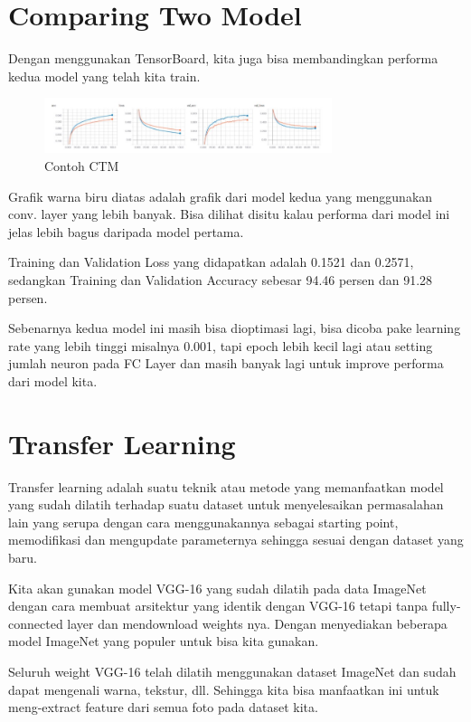 \section{Comparing Two Model}
Dengan menggunakan TensorBoard, kita juga bisa membandingkan performa kedua model yang telah kita train.
\begin{figure}[!htp]
	\includegraphics[width=0.75\textwidth]{figures/ComparingTwoModel.PNG}
	\caption{Contoh CTM}
	\label{labelgambar4}
\end{figure}

Grafik warna biru diatas adalah grafik dari model kedua yang menggunakan conv. layer yang lebih banyak. Bisa dilihat disitu kalau performa dari model ini jelas lebih bagus daripada model pertama.

Training dan Validation Loss yang didapatkan adalah 0.1521 dan 0.2571, sedangkan Training dan Validation Accuracy sebesar 94.46 persen dan 91.28 persen.

Sebenarnya kedua model ini masih bisa dioptimasi lagi, bisa dicoba pake learning rate yang lebih tinggi misalnya 0.001, tapi epoch lebih kecil lagi atau setting jumlah neuron pada FC Layer dan masih banyak lagi untuk improve performa dari model kita.




\section{Transfer Learning}
Transfer learning adalah suatu teknik atau metode yang memanfaatkan model yang sudah dilatih terhadap suatu dataset untuk menyelesaikan permasalahan lain yang serupa dengan cara menggunakannya sebagai starting point, memodifikasi dan mengupdate parameternya sehingga sesuai dengan dataset yang baru.

Kita akan gunakan model VGG-16 yang sudah dilatih pada data ImageNet dengan cara membuat arsitektur yang identik dengan VGG-16 tetapi tanpa fully-connected layer dan mendownload weights nya. Dengan menyediakan beberapa model ImageNet yang populer untuk bisa kita gunakan.

Seluruh weight VGG-16 telah dilatih menggunakan dataset ImageNet dan sudah dapat mengenali warna, tekstur, dll. Sehingga kita bisa manfaatkan ini untuk meng-extract feature dari semua foto pada dataset kita.



